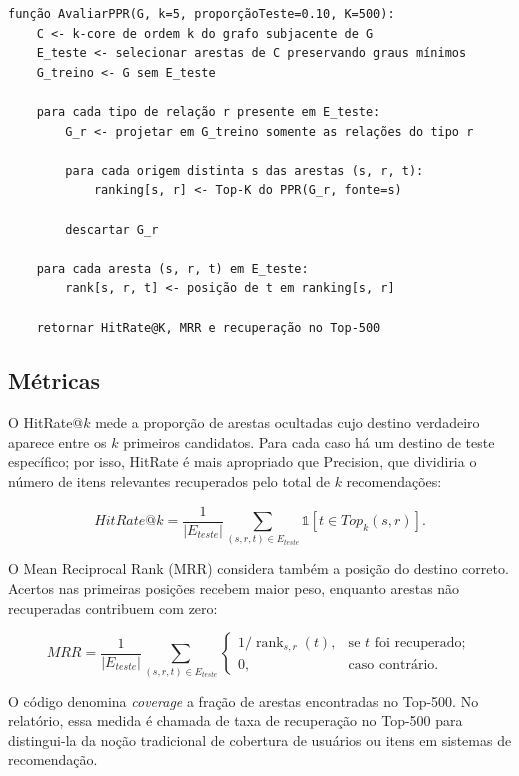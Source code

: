 \documentclass[10pt,a4paper]{article}
\begin{document}
\begin{lstlisting}[caption={Pseudocódigo da avaliação do PPR por predição de ligações.},label={lst:ppr}]
função AvaliarPPR(G, k=5, proporçãoTeste=0.10, K=500):
    C <- k-core de ordem k do grafo subjacente de G
    E_teste <- selecionar arestas de C preservando graus mínimos
    G_treino <- G sem E_teste

    para cada tipo de relação r presente em E_teste:
        G_r <- projetar em G_treino somente as relações do tipo r

        para cada origem distinta s das arestas (s, r, t):
            ranking[s, r] <- Top-K do PPR(G_r, fonte=s)

        descartar G_r

    para cada aresta (s, r, t) em E_teste:
        rank[s, r, t] <- posição de t em ranking[s, r]

    retornar HitRate@K, MRR e recuperação no Top-500
\end{lstlisting}

\subsection{Métricas}

O HitRate@$k$ mede a proporção de arestas ocultadas cujo destino verdadeiro aparece entre os $k$ primeiros candidatos. Para cada caso há um destino de teste específico; por isso, HitRate é mais apropriado que Precision, que dividiria o número de itens relevantes recuperados pelo total de $k$ recomendações:

\begin{equation}
HitRate@k=\frac{1}{|E_{teste}|}
\sum_{(s,r,t)\in E_{teste}}
\mathbb{1}\!\left[t\in Top_k(s,r)\right].
\label{eq:hitrate}
\end{equation}

O Mean Reciprocal Rank (MRR) considera também a posição do destino correto. Acertos nas primeiras posições recebem maior peso, enquanto arestas não recuperadas contribuem com zero:

\begin{equation}
MRR=\frac{1}{|E_{teste}|}
\sum_{(s,r,t)\in E_{teste}}
\begin{cases}
1/\operatorname{rank}_{s,r}(t), & \text{se }t\text{ foi recuperado};\\
0, & \text{caso contrário}.
\end{cases}
\label{eq:mrr}
\end{equation}

O código denomina \textit{coverage} a fração de arestas encontradas no Top-500. No relatório, essa medida é chamada de taxa de recuperação no Top-500 para distingui-la da noção tradicional de cobertura de usuários ou itens em sistemas de recomendação.
\end{document}
